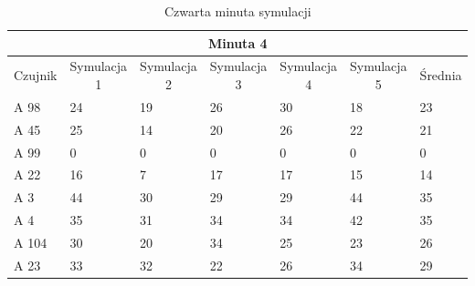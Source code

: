\documentclass[a4paper,12pt]{article}
\begin{document}
\begin{table}[!h]
	\centering

\begin{tabular}{|l|l|l|l|l|l|l|}
\hline
\multicolumn{7}{|c|}{Minuta 4}                                                                                                                                                                                                                   \\ \hline
\multicolumn{1}{|c|}{Czujnik} & \multicolumn{1}{c|}{Symulacja 1} & \multicolumn{1}{c|}{Symulacja 2} & \multicolumn{1}{c|}{Symulacja 3} & \multicolumn{1}{c|}{Symulacja 4} & \multicolumn{1}{c|}{Symulacja 5} & \multicolumn{1}{c|}{Średnia} \\ \hline
A 98                          & 24                               & 19                               & 26                              & 30                             & 18                             & 23                                     \\ \hline
A 45                          & 25                               & 14                               & 20                              & 26                             & 22                             & 21                                     \\ \hline
A 99                          & 0                                & 0                                & 0                               & 0                              & 0                              & 0                                      \\ \hline
A 22                          & 16                               & 7                                & 17                              & 17                             & 15                             & 14                                     \\ \hline
A 3                           & 44                               & 30                               & 29                              & 29                             & 44                             & 35                                     \\ \hline
A 4                           & 35                               & 31                               & 34                              & 34                             & 42                             & 35                                     \\ \hline
A 104                         & 30                               & 20                               & 34                              & 25                             & 23                             & 26                                     \\ \hline
A 23                          & 33                               & 32                               & 22                              & 26                             & 34                             & 29                                     \\ \hline
\end{tabular}
\caption{Czwarta minuta symulacji}
\label{tab:4}
\end{table}
\end{document}

